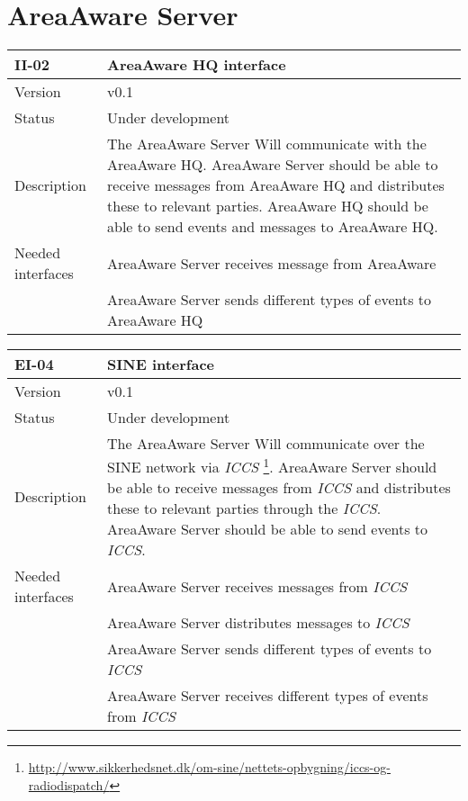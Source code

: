 \section{AreaAware Server}
\begin{longtable}{| p{3.5cm} |  p{10cm} | }
	\hline
	\textbf{II-02} &  \textbf{AreaAware HQ interface } \\
	\hline
	Version & v0.1 \\
	\hline
	Status & Under development \\
	\hline
	Description & The AreaAware Server Will communicate with the AreaAware HQ. AreaAware Server should be able to receive messages from AreaAware HQ and distributes these to relevant parties.  AreaAware HQ should be able to send events and messages to AreaAware HQ.
	\\
	\hline
	Needed interfaces & AreaAware Server receives message from AreaAware \\
	& AreaAware Server sends different types of events to AreaAware HQ \\
	\hline
\end{longtable}

\begin{longtable}{| p{3.5cm} |  p{10cm} | }
	\hline
	\textbf{EI-04} &  \textbf{SINE interface} \\
	\hline
	Version & v0.1 \\
	\hline
	Status & Under development \\
	\hline
	Description & The AreaAware Server Will communicate over the SINE network via \emph{ICCS} \footnote{\url{http://www.sikkerhedsnet.dk/om-sine/nettets-opbygning/iccs-og-radiodispatch/}}. AreaAware Server should be able to receive messages from \emph{ICCS} and distributes these to relevant parties through the \emph{ICCS}.  AreaAware Server should be able to send events to \emph{ICCS}.
	\\
	\hline
	Needed interfaces 
	& AreaAware Server receives messages from \emph{ICCS} \\
	& AreaAware Server distributes messages to \emph{ICCS} \\
	& AreaAware Server sends different types of events to \emph{ICCS} \\
	& AreaAware Server receives different types of events from \emph{ICCS} \\
	\hline
\end{longtable}

